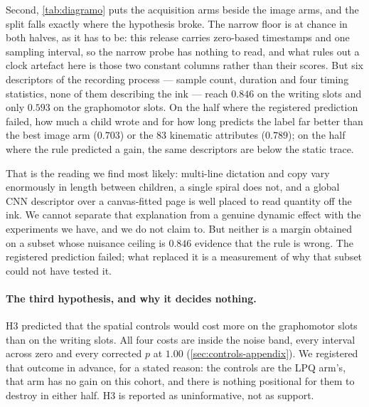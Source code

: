 \documentclass{article}
\begin{document}
Second, \cref{tab:diagramo} puts the acquisition arms beside the image arms, and the split falls
exactly where the hypothesis broke. The narrow floor is at chance in both halves, as it has to be:
this release carries zero-based timestamps and one sampling interval, so the narrow probe has
nothing to read, and what rules out a clock artefact here is those two constant columns rather than
their scores. But six descriptors of the recording process --- sample count, duration and four
timing statistics, none of them describing the ink --- reach $\mathbf{0.846}$ on the writing slots
and only $0.593$ on the graphomotor slots. On the half where the registered prediction failed, how
much a child wrote and for how long predicts the label far better than the best image arm ($0.703$)
or the $83$ kinematic attributes ($0.789$); on the half
where the rule predicted a gain, the same descriptors are below the static trace.

That is the reading we find most likely: multi-line dictation and copy vary enormously in length
between children, a single spiral does not, and a global CNN descriptor over a canvas-fitted page is
well placed to read quantity off the ink. We cannot separate that explanation from a genuine dynamic
effect with the experiments we have, and we do not claim to. But neither is a margin obtained on a
subset whose nuisance ceiling is $0.846$ evidence that the rule is wrong. The registered
prediction failed; what replaced it is a measurement of why that subset could not have tested it.

\paragraph{The third hypothesis, and why it decides nothing.} H3 predicted that the spatial
controls would cost more on the graphomotor slots than on the writing slots. All four costs are
inside the noise band, every interval across zero and every corrected $p$ at $1.00$
(\cref{sec:controls-appendix}). We registered that outcome in advance, for a stated reason: the
controls are the LPQ arm's, that arm has no gain on this cohort, and there is nothing positional for
them to destroy in either half. H3 is reported as uninformative, not as support.
\end{document}
